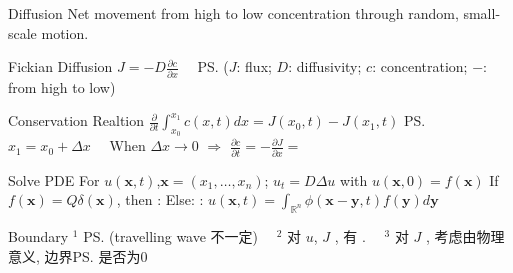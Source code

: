 \documentclass{note}
\begin{document}
\begin{MyTh}{Diffusion}
    \scriptsize Net movement from high to low concentration through random, small-scale motion.
\end{MyTh}
\begin{MyTh}{Fickian Diffusion}
    \scriptsize $J=-D\frac{\partial c}{\partial x}$ \ \ \ps{\tiny ($J$: flux; $D$: diffusivity; $c$: concentration; $-$: from high to low)}
\end{MyTh}

\vspace{-2pt}
\begin{MyTh}{Conservation Realtion}
    \tiny $\frac{\partial}{\partial t}\int_{x_0}^{x_1} c(x,t)dx=J(x_0,t)-J(x_1,t)$ \ps{\tiny $x_1=x_0+\Delta x$} \ \ When $\Delta x\to0$ $\Rightarrow$ $\frac{\partial c}{\partial t}=-\frac{\partial J}{\partial x}=$ 
\end{MyTh}

\vspace{-5pt}
\begin{MyTh}{Solve PDE}
    {\tiny For $u(\mathbf{x},t)$,$\mathbf{x}=(x_1,\ldots,x_n)$; $u_t=D\Delta u$ with $u(\mathbf{x},0)=f(\mathbf{x})$ \quad If $f(\mathbf{x})=Q\delta(\mathbf{x})$, then :  \quad Else: : $u(\mathbf{x},t)=\int_{\mathbb{R}^n} \phi(\mathbf{x}-\mathbf{y},t)f(\mathbf{y})d\mathbf{y}$}

    \vspace{-4pt}
\end{MyTh}

\begin{MyTh}{Boundary}
    \tiny $^1$  \ps{\tiny (travelling wave 不一定)}  \ \ $^2$ 对 $u$, $J$ , 有 .  \ \ $^3$ 对 $J$ , 考虑由物理意义, 边界\ps{\tiny 是否为0}
\end{MyTh}
\end{document}
